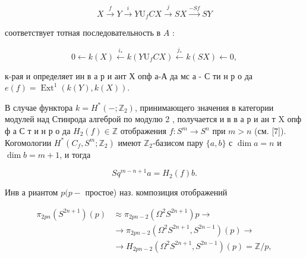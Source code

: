\documentclass[10pt]{article}
\begin{document}
\[

X \stackrel{f}{\longrightarrow} Y \stackrel{i}{\longrightarrow} Y \mathrm{U}_{f} C X \stackrel{j}{\longrightarrow} S X \stackrel{-S f}{\longrightarrow} S Y

\]



соответствует тотная последовательность в $A$ :



\[

0 \leftarrow k(X) \stackrel{i_{*}}{\longleftarrow} k\left(Y \mathrm{U}_{f} C X\right) \stackrel{j_{*}}{\longleftarrow} k(S X) \leftarrow 0,

\]



к-рая и определяет ин в а р и ант Х опф а-А да мс а - С ти н р о да $e(f)=\operatorname{Ext}^{1}(k(Y), k(X))$.



В случае функтора $k=H^{*}\left(-; \mathbb{Z}_{2}\right)$, принимающего значения в категории модулей над Стинрода алгеброй по модулю 2 , получается и в в а р и ан т $\mathrm{X}$ опф ф а С т и н р о да $H_{2}(f) \in \mathbb{Z}$ отображения $f: S^{m} \longrightarrow S^{n}$ при $m>n$ (см. [7]). Когомологии $H^{*}\left(C_{f}, S^{m} ; \mathbb{Z}_{2}\right)$ имеют $\mathbb{Z}_{2}$-базисом пару $\{a, b\}$ с $\operatorname{dim} a=n$ и $\operatorname{dim} b=m+1$, и тогда



\[

S q^{m-n+1} a=H_{2}(f) b .

\]



Инв а риантом $p(p-$ простое) наз. композиция отображений



\[

\begin{aligned}

\pi_{2 p n}\left(S^{2 n+1}\right)(p) & \approx \pi_{2 p n-2}\left(\Omega^{2} S^{2 n+1}\right) p \rightarrow \\

& \rightarrow \pi_{2 p n-2}\left(\Omega^{2} S^{2 n+1}, S^{2 n-1}\right)(p) \rightarrow \\

& \rightarrow H_{2 p n-2}\left(\Omega^{2} S^{2 n+1}, S^{2 n-1}\right)(p)=\mathbb{Z} / p,

\end{aligned}

\]
\end{document}
